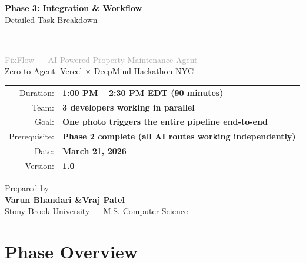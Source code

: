 \documentclass[11pt, a4paper]{article}
\begin{document}
\begin{titlepage}
\centering
\vspace*{2cm}

{\Huge\bfseries\textcolor{primary}{Phase 3: Integration \& Workflow}}\\[0.6cm]
{\LARGE\textcolor{accent}{Detailed Task Breakdown}}\\[0.3cm]
\textcolor{accent}{\rule{0.6\textwidth}{1.5pt}}\\[1cm]

{\Large\textcolor{darkgray}{FixFlow --- AI-Powered Property Maintenance Agent}}\\[0.5cm]
{\large\textcolor{textmuted}{Zero to Agent: Vercel $\times$ DeepMind Hackathon NYC}}\\[2cm]

\begin{tabular}{rl}
\textcolor{textmuted}{Duration:} & \textbf{1:00 PM -- 2:30 PM EDT (90 minutes)} \\[6pt]
\textcolor{textmuted}{Team:} & \textbf{3 developers working in parallel} \\[6pt]
\textcolor{textmuted}{Goal:} & \textbf{One photo triggers the entire pipeline end-to-end} \\[6pt]
\textcolor{textmuted}{Prerequisite:} & \textbf{Phase 2 complete (all AI routes working independently)} \\[6pt]
\textcolor{textmuted}{Date:} & \textbf{March 21, 2026} \\[6pt]
\textcolor{textmuted}{Version:} & \textbf{1.0} \\
\end{tabular}

\vfill

{\normalsize\textcolor{textmuted}{Prepared by}}\\[4pt]
{\large\textbf{Varun Bhandari \quad\&\quad Vraj Patel}}\\[2pt]
{\small\textcolor{textmuted}{Stony Brook University --- M.S. Computer Science}}

\end{titlepage}

\section{Phase Overview}
\end{document}
